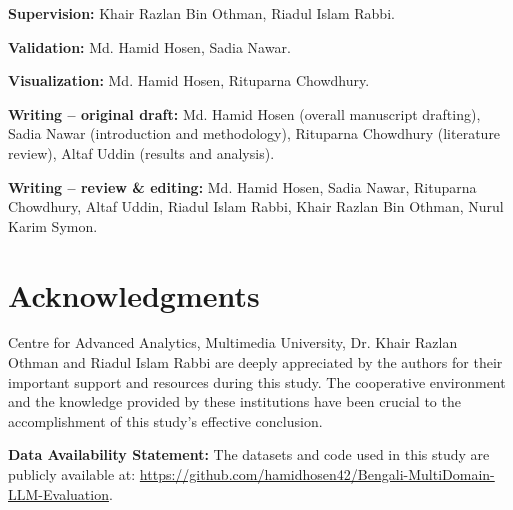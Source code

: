 \documentclass[10pt,letterpaper]{article}
\begin{document}
\textbf{Supervision:} Khair Razlan Bin Othman, Riadul Islam Rabbi.

\textbf{Validation:} Md. Hamid Hosen, Sadia Nawar.

\textbf{Visualization:} Md. Hamid Hosen, Rituparna Chowdhury.

\textbf{Writing – original draft:}  
Md. Hamid Hosen (overall manuscript drafting),  
Sadia Nawar (introduction and methodology),  
Rituparna Chowdhury (literature review),  
Altaf Uddin (results and analysis).

\textbf{Writing – review \& editing:}  
Md. Hamid Hosen, Sadia Nawar, Rituparna Chowdhury, Altaf Uddin,  
Riadul Islam Rabbi, Khair Razlan Bin Othman, Nurul Karim Symon.




\section*{Acknowledgments}
 Centre for Advanced Analytics, Multimedia University, Dr. Khair Razlan Othman and Riadul Islam Rabbi are deeply appreciated by the authors for their important support and resources during this study. The cooperative environment and the knowledge provided by these institutions have been crucial to the accomplishment of this study's effective conclusion.

 \noindent \textbf{Data Availability Statement:} 
The datasets and code used in this study are publicly available at: \url{https://github.com/hamidhosen42/Bengali-MultiDomain-LLM-Evaluation}.

\nolinenumbers

%
%


\end{document}
